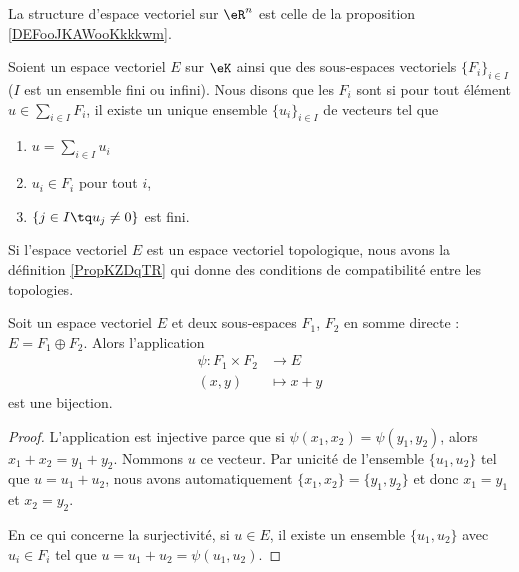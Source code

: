 \begin{definition}	\label{DEFooLFXCooUJIcPh}
	La structure d'espace vectoriel sur \( \eR^n\) est celle de la proposition \ref{DEFooJKAWooKkkkwm}.
\end{definition}

\begin{definition}       \label{DEFooIJDNooRUDUYF}
	Soient un espace vectoriel \( E\) sur \(\eK\) ainsi que des sous-espaces vectoriels \( \{ F_i \}_{i\in I}\) (\( I\) est un ensemble fini ou infini). Nous disons que les \( F_i\) sont  si pour tout élément \( u\in\sum_{i\in I}F_i\), il existe un unique ensemble \( \{ u_i \}_{i\in I}\) de vecteurs tel que
	\begin{enumerate}
		\item
		      \( u=\sum_{i\in I}u_i\)
		\item
		      \( u_i\in F_i\) pour tout \( i\),
		\item
		      \( \{ j\in I\tq u_j\neq 0 \}\) est fini.
	\end{enumerate}

	Si l'espace vectoriel \( E\) est un espace vectoriel topologique, nous avons la définition \ref{PropKZDqTR} qui donne des conditions de compatibilité entre les topologies.
\end{definition}


\begin{lemma}   \label{LEMooHWRVooLedAmF}
	Soit un espace vectoriel \( E\) et deux sous-espaces \( F_1\), \( F_2\) en somme directe :  \( E=F_1\oplus F_2\). Alors l'application
	\begin{equation}
		\begin{aligned}
			\psi\colon F_1\times F_2 & \to E       \\
			(x,y)                    & \mapsto x+y
		\end{aligned}
	\end{equation}
	est une bijection.
\end{lemma}

\begin{proof}
	L'application est injective parce que si \( \psi(x_1,x_2)=\psi(y_1,y_2)\), alors \( x_1+x_2=y_1+y_2\). Nommons \(u\) ce vecteur. Par unicité de l'ensemble \(  \{ u_1,u_2 \} \) tel que \( u=u_1+u_2\), nous avons automatiquement \( \{ x_1,x_2 \}=\{ y_1,y_2 \}\) et donc \( x_1=y_1\) et \( x_2=y_2\).

	En ce qui concerne la surjectivité, si \( u\in E\), il existe un ensemble \( \{ u_1,u_2 \}\) avec \( u_i\in F_i\) tel que \( u=u_1+u_2=\psi(u_1,u_2)\).
\end{proof}


